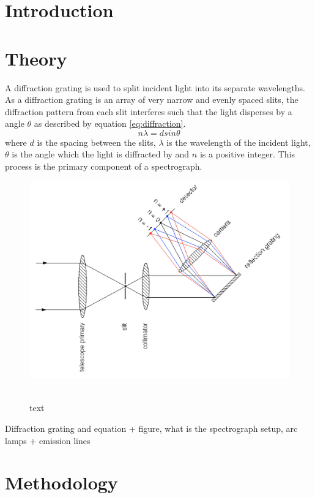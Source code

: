 \documentclass[a4paper,12pt,twocolumn]{article}
\let\cite=\supercite
\begin{document}
	\section{Introduction}
	
	\section{Theory}
		A diffraction grating is used to split incident light into its separate wavelengths. As a diffraction grating is an array of very narrow and evenly spaced slits, the diffraction pattern from each slit interferes such that the light disperses by a angle $\theta$ as described by equation \ref{eq:diffraction}\cite{universityPhysics}.
		\begin{equation}
			n \lambda = d sin\theta
			\label{eq:diffraction}
		\end{equation} where $d$ is the spacing between the slits, $\lambda$ is the wavelength of the incident light, $\theta$ is the angle which the light is diffracted by and $n$ is a positive integer. This process is the primary component of a spectrograph.
	
		\begin{figure}
			\includegraphics[width=\columnwidth]{spectrograph_refl-transformed.png}
			\label{fig:spectrograph}
			\
			\caption{text}
		\end{figure}
	
		Diffraction grating and equation + figure, what is the spectrograph setup, arc lamps + emission lines
	
	\section{Methodology}
\end{document}
